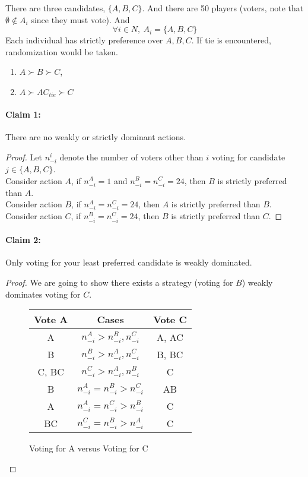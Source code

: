 \documentclass[11pt]{article}
\begin{document}
		\begin{example}
			There are three candidates, $\{A, B, C\}$. And there are 50 players (voters, note that $\emptyset \notin A_i$ since they must vote).
			And 
			\[
				\forall i \in N,\ A_i = \{A, B, C\}
			\]
			Each individual has strictly preference over $A, B, C$. If tie is encountered, randomization would be taken.
			\begin{enumerate}[i]
				\item $A \succ B \succ C$,
				\item $A \succ AC_{tie} \succ C$
			\end{enumerate}
			\paragraph{Claim 1:}There are no weakly or strictly dominant actions.
			\begin{proof}
				Let $n_{-i}^i$ denote the number of voters other than $i$ voting for candidate $j \in \{A, B, C\}$. \\
				Consider action $A$, if $n_{-i}^A = 1$ and $n_{-i}^B = n_{-i}^C = 24$, then $B$ is strictly preferred than $A$. \\
				Consider action $B$, if $n_{-i}^A = n_{-i}^C = 24$, then $A$ is strictly preferred than $B$. \\
				Consider action $C$, if $n_{-i}^B = n_{-i}^C = 24$, then $B$ is strictly preferred than $C $.
			\end{proof}
			\paragraph{Claim 2:}Only voting for your least preferred candidate is weakly dominated.
			\begin{proof}
				We are going to show there exists a strategy (voting for $B$) weakly dominates voting for $C$.
				\begin{figure}[H]
					\centering
					\begin{tabular}{c|c|c}
						Vote A & Cases & Vote C \\
						\hline
						A & $n_{-i}^A > n_{-i}^B, n_{-i}^C$ & A, AC \\
						B & $n_{-i}^B > n_{-i}^A, n_{-i}^C$ & B, BC \\
						C, BC & $n_{-i}^C > n_{-i}^A, n_{-i}^B$ & C\\
						B & $n_{-i}^A = n_{-i}^B > n_{-i}^C$ & AB\\
						A & $n_{-i}^A = n_{-i}^C > n_{-i}^B$ & C\\
						BC & $n_{-i}^C = n_{-i}^B > n_{-i}^A$ & C
					\end{tabular}
					\caption{Voting for A versus Voting for C}
				\end{figure}
			\end{proof}
		\end{example}
		
\end{document}
